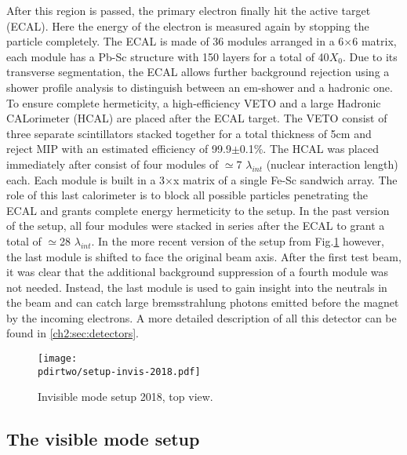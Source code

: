 After this region is passed, the primary electron finally hit the active target (ECAL). Here the energy of the electron is measured again by stopping the particle completely. The ECAL is made of 36 modules arranged in a 6$\times$6 matrix, each module has a Pb-Sc structure with 150 layers for a total of 40$X_0$. Due to its transverse segmentation, the ECAL allows further background rejection using a shower profile analysis to distinguish between an em-shower and a hadronic one. To ensure complete hermeticity, a high-efficiency VETO and a large Hadronic CALorimeter (HCAL) are placed after the ECAL target. The VETO consist of three separate scintillators stacked together for a total thickness of 5\si{cm} and reject MIP with an estimated efficiency of 99.9$\pm$0.1\%. The HCAL was placed immediately after consist of four modules of $\simeq$7 $\lambda_{int}$ (nuclear interaction length) each. Each module is built in a 3$\times$x matrix of a single Fe-Sc sandwich array. The role of this last calorimeter is to block all possible particles penetrating the ECAL and grants complete energy hermeticity to the setup. In the past version of the setup, all four modules were stacked in series after the ECAL to grant a total of $\simeq$28 $\lambda_{int}$. In the more recent version of the setup from Fig.\ref{fig:setup-invis-2018} however, the last module is shifted to face the original beam axis. After the first test beam, it was clear that the additional background suppression of a fourth module was not needed. Instead, the last module is used to gain insight into the neutrals in the beam and can catch large bremsstrahlung photons emitted before the magnet by the incoming electrons. A more detailed description of all this detector can be found in \ref{ch2:sec:detectors}.

\begin{figure}[tbh!]
\centering
\texttt{[image: \\pdirtwo/setup-invis-2018.pdf]}
\caption[invisible mode setup 2018]{Invisible mode setup 2018, top view.}
\label{fig:setup-invis-2018}
\end{figure}

\subsection{The visible mode setup}
\label{ch2:sec:vismode}

